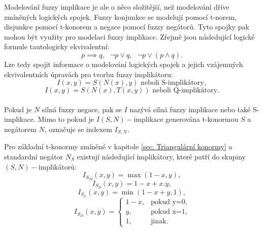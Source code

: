 Modelov\'an\'i fuzzy implikace je ale o něco složitější, než modelov\'an\'i dříve zmíněných logických spojek. Fuzzy konjunkce se modelují pomocí t-norem, disjunkce pomocí t-konorem a negace pomocí fuzzy negátor\r u. Tyto spojky pak mohou být využity pro modelaci fuzzy implikace. Zřejmě jsou následující logické formule tautologicky ekvivalentní: $$ p\implies q, \mbox{   } \neg p \vee q, \mbox{   } \neg p\vee (p\wedge q) .$$ Lze tedy spojit informace o modelov\'an\'i logických spojek a jejich vzájemných ekvivalentních \' upravách pro tvorbu fuzzy implikátoru: $$I(x,y)=S(N(x),y)\text{ neboli S-implikátory},$$
$$I(x,y)=S(N(x),T(x,y)) \text{ neboli Q-implikátory}.$$\\
Pokud je $N$ silná fuzzy negace, pak se $I$ nazývá silná fuzzy implikace nebo také S-implikace. Mimo to pokud je $I (S,N)-$implikace generována t-konormou $S$ a negátorem $N$, označuje se indexem $I_{S,N}.$ 

\begin{example}
\cite{hlinena}
Pro základní t-konormy zmíněné v kapitole \ref{sec: Triangulární konormy} a standardní negátor $N_S$ existují následující implikátory, které patří do skupiny $(S,N)-$implikátor\r u:\\
    \vbox{$$ I_{S_M}(x,y)=\max(1-x,y),$$ }
\vbox{$$ I_{S_P}(x,y)=1-x+x.y,$$}
 \vbox{$$ I_{S_L}(x,y)=\min(1-x+y,1),$$}
 $$ I_{S_D}(x,y)=\begin{cases} 1-x,
&\mbox {pokud y=0,} \\y, &\mbox {pokud x=1}, \\
1, &\mbox {jinak.} \end{cases} $$
\end{example}

